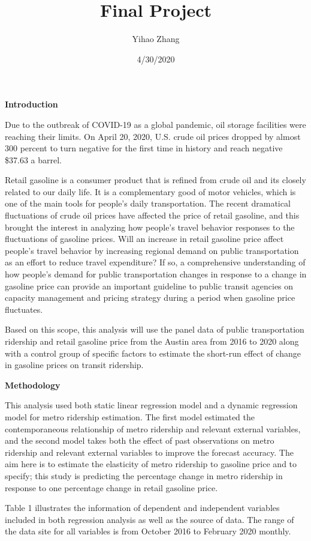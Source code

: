 \documentclass[]{article}
\title{Final Project}
\author{Yihao Zhang}
\date{4/30/2020}
\begin{document}
\maketitle

\textbf{Introduction}

Due to the outbreak of COVID-19 as a global pandemic, oil storage
facilities were reaching their limits. On April 20, 2020, U.S. crude oil
prices dropped by almost 300 percent to turn negative for the first time
in history and reach negative \$37.63 a barrel.

Retail gasoline is a consumer product that is refined from crude oil and
its closely related to our daily life. It is a complementary good of
motor vehicles, which is one of the main tools for people's daily
transportation. The recent dramatical fluctuations of crude oil prices
have affected the price of retail gasoline, and this brought the
interest in analyzing how people's travel behavior responses to the
fluctuations of gasoline prices. Will an increase in retail gasoline
price affect people's travel behavior by increasing regional demand on
public transportation as an effort to reduce travel expenditure? If so,
a comprehensive understanding of how people's demand for public
transportation changes in response to a change in gasoline price can
provide an important guideline to public transit agencies on capacity
management and pricing strategy during a period when gasoline price
fluctuates.

Based on this scope, this analysis will use the panel data of public
transportation ridership and retail gasoline price from the Austin area
from 2016 to 2020 along with a control group of specific factors to
estimate the short-run effect of change in gasoline prices on transit
ridership.

\textbf{Methodology}

This analysis used both static linear regression model and a dynamic
regression model for metro ridership estimation. The first model
estimated the contemporaneous relationship of metro ridership and
relevant external variables, and the second model takes both the effect
of past observations on metro ridership and relevant external variables
to improve the forecast accuracy. The aim here is to estimate the
elasticity of metro ridership to gasoline price and to specify; this
study is predicting the percentage change in metro ridership in response
to one percentage change in retail gasoline price.

Table 1 illustrates the information of dependent and independent
variables included in both regression analysis as well as the source of
data. The range of the data site for all variables is from October 2016
to February 2020 monthly.
\end{document}
